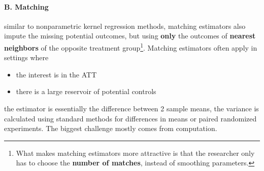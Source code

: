 \documentclass[twoside]{article}
\begin{document}
\paragraph*{B. Matching}
similar to nonparametric kernel regression methods, matching estimators also impute the missing potential outcomes, but using \textbf{only} the outcomes of \textbf{nearest neighbors} of the opposite treatment group\footnote{What makes matching estimators more attractive is that the researcher only has to choose the \textbf{number of matches}, instead of smoothing parameters.}. Matching estimators often apply in settings where 
\begin{itemize}
    \item the interest is in the ATT
    \item there is a large reservoir of potential controls
\end{itemize}
the estimator is essentially the difference between 2 sample means, the variance is calculated using standard methods for differences in means or paired randomized experiments. The biggest challenge mostly comes from computation.
\end{document}
